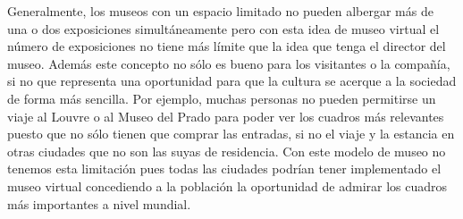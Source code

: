 \documentclass[a4paper,11pt]{article}
\begin{document}
Generalmente, los museos con un espacio limitado no pueden albergar más de una o dos exposiciones simultáneamente pero con esta idea de museo virtual el número de exposiciones no tiene más límite que la idea que tenga el director del museo. Además este concepto no sólo es bueno para los visitantes o la compañía, si no que representa una oportunidad para que la cultura se acerque a la sociedad de forma más sencilla. Por ejemplo, muchas personas no pueden permitirse un viaje al Louvre o al Museo del Prado para poder ver los cuadros más relevantes puesto que no sólo tienen que comprar las entradas, si no el viaje y la estancia en otras ciudades que no son las suyas de residencia. Con este modelo de museo no tenemos esta limitación pues todas las ciudades podrían tener implementado el museo virtual concediendo a la población la oportunidad de admirar los cuadros más importantes a nivel mundial.
\end{document}

